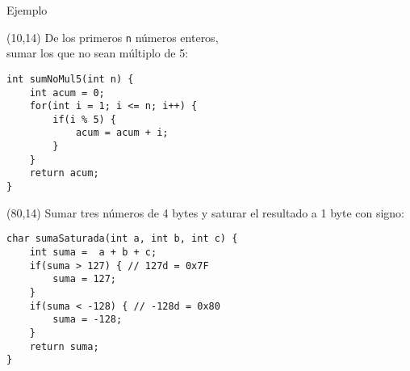 \documentclass[aspectratio=169]{beamer}
\begin{document}
\begin{frame}[fragile,t]{Ejemplo}
\begin{textblock}{60}(10,14)
\small
\textcolor{verdeuca}{De los primeros \texttt{n} números enteros,\\ sumar los que no sean múltiplo de 5:}
\vspace{-0.1cm}
\begin{verbatim}
int sumNoMul5(int n) {
    int acum = 0;
    for(int i = 1; i <= n; i++) {
        if(i % 5) {
            acum = acum + i;
        }
    }
    return acum;
}
\end{verbatim}
\end{textblock}
\begin{textblock}{60}(80,14)
\textcolor{verdeuca}{Sumar tres números de 4 bytes y saturar el resultado a 1 byte con signo:}
\vspace{-0.1cm}
\begin{verbatim}
char sumaSaturada(int a, int b, int c) {
    int suma =  a + b + c;
    if(suma > 127) { // 127d = 0x7F
        suma = 127;
    }
    if(suma < -128) { // -128d = 0x80
        suma = -128;
    }
    return suma;
}
\end{verbatim}
\end{textblock}
\end{frame}


\end{document}
